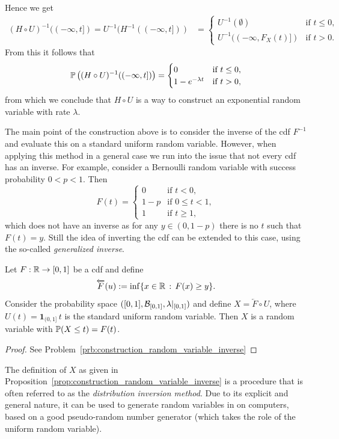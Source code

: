 Hence we get
\begin{align*}
	(H \circ U)^{-1}((-\infty, t]) = U^{-1}(H^{-1}((-\infty, t]))
	&= \begin{cases}
		U^{-1}(\emptyset) &\text{if } t \le 0,\\
		U^{-1}((-\infty, F_X(t)]) &\text{if } t > 0.
	\end{cases}
\end{align*}
From this it follows that 
\[
	\mathbb P\left((H \circ U)^{-1}((-\infty, t])\right) = \begin{cases}
			0 &\text{if } t \le 0,\\
			1-e^{-\lambda t} &\text{if } t > 0,
		\end{cases}
\]
from which we conclude that $H \circ U$ is a way to construct an exponential random variable with rate $\lambda$.

The main point of the construction above is to consider the inverse of the cdf $F^{-1}$ and evaluate this on a standard uniform random variable. However, when applying this method in a general case we run into the issue that not every cdf has an inverse. For example, consider a Bernoulli random variable with success probability $0 < p < 1$. Then
\[
	F(t) = \begin{cases}
		0 &\text{if } t < 0, \\
		1-p &\text{if } 0 \le t < 1, \\
		1 &\text{if } t \ge 1,
	\end{cases}
\] 
which does not have an inverse as for any $y \in (0,1-p)$ there is no $t$ such that $F(t) = y$. Still the idea of inverting the cdf can be extended to this case, using the so-called \emph{generalized inverse}. 

\begin{proposition}\label{prop:construction_random_variable_inverse}
Let $F : \mathbb R \to [0,1]$ be a cdf and define
\[
	\overleftarrow{F}(u) := \inf\{ x \in \mathbb R \, : \, F(x) \ge y\}.
\]  
Consider the probability space $([0,1], \mathcal B_{[0,1]}, \lambda|_{[0,1]})$ and define $X = \overleftarrow{F}\circ U$, where $U(t) = \mathbf{1}_{(0,1]} \, t$ is the standard uniform random variable. Then $X$ is a random variable with $\mathbb P(X \le t) = F(t)$.
\end{proposition}

\begin{proof}
See Problem~\ref{prb:construction_random_variable_inverse}
\end{proof}

The definition of $X$ as given in Proposition~\ref{prop:construction_random_variable_inverse} is a procedure that is often referred to as the \emph{distribution inversion method}. Due to its explicit and general nature, it can be used to generate random variables in on computers, based on a good pseudo-random number generator (which takes the role of the uniform random variable).

